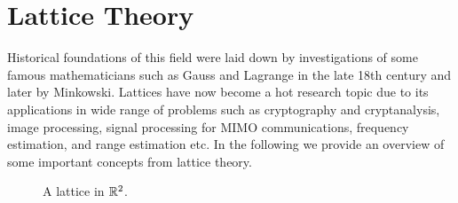 \section{Lattice Theory}\label{sec:ch2-lattice-theory}
Historical foundations of this field were laid down by investigations of some famous mathematicians such as Gauss and Lagrange in the late 18th century and later by Minkowski. Lattices have now become a hot research topic due to its applications in wide range of problems such as cryptography and cryptanalysis, image processing, signal processing for MIMO communications, frequency estimation, and range estimation etc. In the following we provide an overview of some important concepts from lattice theory.
\begin{figure}[t]
  \centering
  \caption{A lattice in ${\mathbb R}^2$.}
  \label{fig:ch2-lattice-1}
\end{figure}

